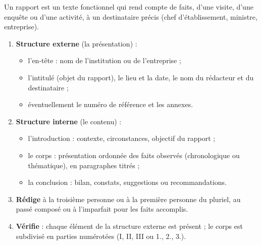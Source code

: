 \documentclass[11pt]{article}
\newcommand{\cle}[1]{{\popxbold\color{popdark}#1}}
\begin{document}
\begin{methode}
Un rapport est un texte fonctionnel qui rend compte de faits, d'une visite, d'une enquête ou d'une activité, à un destinataire précis (chef d'établissement, ministre, entreprise).
\begin{enumerate}
\item \textbf{Structure externe} (la présentation) :
\begin{itemize}
\item l'\cle{en-tête} : nom de l'institution ou de l'entreprise ;
\item l'\cle{intitulé} (objet du rapport), le lieu et la date, le nom du rédacteur et du destinataire ;
\item éventuellement le numéro de référence et les annexes.
\end{itemize}
\item \textbf{Structure interne} (le contenu) :
\begin{itemize}
\item l'\cle{introduction} : contexte, circonstances, objectif du rapport ;
\item le \cle{corps} : présentation ordonnée des faits observés (chronologique ou thématique), en paragraphes titrés ;
\item la \cle{conclusion} : bilan, constats, suggestions ou recommandations.
\end{itemize}
\item \textbf{Rédige} à la troisième personne ou à la première personne du pluriel, au passé composé ou à l'imparfait pour les faits accomplis.
\item \textbf{Vérifie} : chaque élément de la structure externe est présent ; le corps est subdivisé en parties numérotées (I, II, III ou 1., 2., 3.).
\end{enumerate}
\end{methode}
\end{document}
